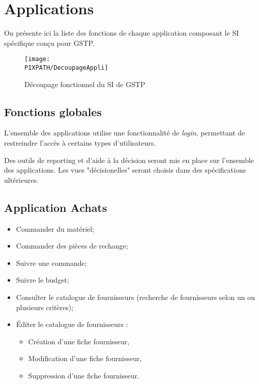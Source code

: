 \section{Applications}

On présente ici la liste des fonctions de chaque application composant le
SI spécifique conçu pour GSTP.

\begin{figure}[h]
\centering
\caption{Découpage fonctionnel du SI de GSTP}
\texttt{[image: \\PIXPATH/DecoupageAppli]}
\end{figure}


\subsection{Fonctions globales}

L'ensemble des applications utilise une fonctionnalité de {\sl login}, permettant
de restreindre l'accès à certains types d'utilisateurs.

Des outils de reporting et d'aide à la décision seront mis en place sur 
l'ensemble des applications. Les vues "décisionelles" seront choisis dans des 
spécifications ultérieures.


\subsection{Application Achats}

\begin{itemize}
\item Commander du matériel;
\item Commander des pièces de rechange;
\item Suivre une commande;
\item Suivre le budget;
\item Consulter le catalogue de fournisseurs (recherche de fournisseurs selon 
un ou plusieurs critères);
\item Éditer le catalogue de fournisseurs :
	\begin{itemize}
	\item Création d'une fiche fournisseur,
	\item Modification d'une fiche fournisseur,
	\item Suppression d'une fiche fournisseur.
	\end{itemize}
\end{itemize}

